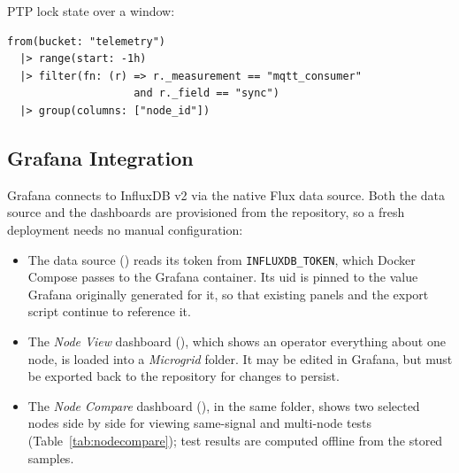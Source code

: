PTP lock state over a window:
\begin{lstlisting}[language=flux]
from(bucket: "telemetry")
  |> range(start: -1h)
  |> filter(fn: (r) => r._measurement == "mqtt_consumer"
                    and r._field == "sync")
  |> group(columns: ["node_id"])
\end{lstlisting}

\subsection{Grafana Integration}
\label{sec:grafana}
Grafana connects to InfluxDB v2 via the native Flux data source. Both the data source and the dashboards are provisioned from the repository, so a fresh deployment needs no manual configuration:
\begin{itemize}[noitemsep]
  \item The data source () reads its token from \texttt{INFLUXDB\_TOKEN}, which Docker Compose passes to the Grafana container. Its uid is pinned to the value Grafana originally generated for it, so that existing panels and the export script continue to reference it.
  \item The \textit{Node View} dashboard (), which shows an operator everything about one node, is loaded into a \textit{Microgrid} folder. It may be edited in Grafana, but must be exported back to the repository for changes to persist.
  \item The \textit{Node Compare} dashboard (), in the same folder, shows two selected nodes side by side for viewing same-signal and multi-node tests (Table~\ref{tab:nodecompare}); test results are computed offline from the stored samples.
\end{itemize}

